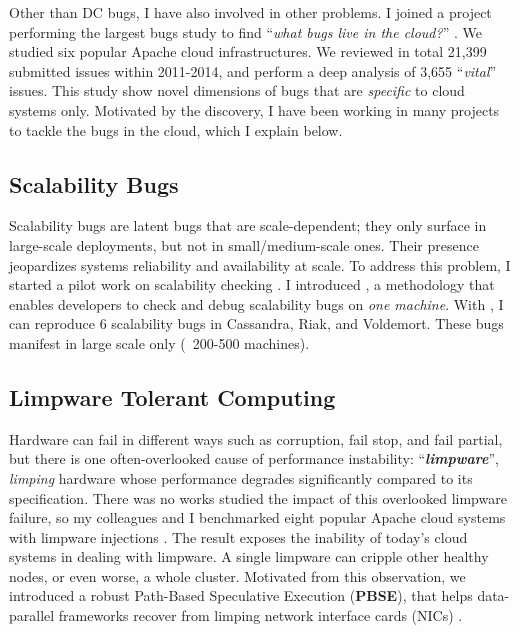 \documentclass[11pt]{article}
\begin{document}
Other than DC bugs, I have also involved in other problems. I
joined a project performing the largest bugs study to find ``\textit{what bugs
live in the cloud?}'' \cite{Gunawi+14-Cbs}.  We studied six popular Apache
cloud infrastructures. We
reviewed in total 21,399 submitted issues within 2011-2014, and perform a deep
analysis of 3,655 ``\textit{vital}'' issues. This study show novel dimensions
of bugs that are \textit{specific} to cloud systems only. Motivated by the
discovery, I have been working in many projects to tackle the bugs in the
cloud, which I explain below.

\subsection{Scalability Bugs}

Scalability bugs are latent bugs that are scale-dependent; they only surface in
large-scale deployments, but not in small/medium-scale ones. Their presence
jeopardizes systems reliability and availability at scale. 
%
To address this problem, I started a pilot work on scalability checking
\cite{Gunawi+17-SCk-Insub,Leesatapornwongsa+17-SCk-InPrep}. I introduced \sck, a methodology that enables
developers to check and debug scalability bugs on \textit{one machine}. With
\sck, I can reproduce 6 scalability bugs in Cassandra, Riak, and Voldemort.
These bugs manifest in large scale only (\eg\ 200-500 machines). 

\subsection{Limpware Tolerant Computing}

Hardware can fail in different ways such as corruption, fail stop, and fail
partial, but there is one often-overlooked cause of performance instability:
``\textbf{\textit{limpware}}'', \textit{limping} hardware whose performance
degrades significantly compared to its specification.  There was no works
studied the impact of this overlooked limpware failure, so my colleagues and I
benchmarked eight popular Apache cloud systems with limpware injections
\cite{Do+13-Limplock}. The result exposes the inability of today's cloud
systems in dealing with limpware. A single limpware can cripple other healthy
nodes, or even worse, a whole cluster.  Motivated from this observation, we
introduced a robust Path-Based Speculative Execution (\textbf{PBSE}), that
helps data-parallel frameworks recover from limping network interface cards (NICs)
\cite{Suminto+17-PBSE-InPrep}.
\end{document}
